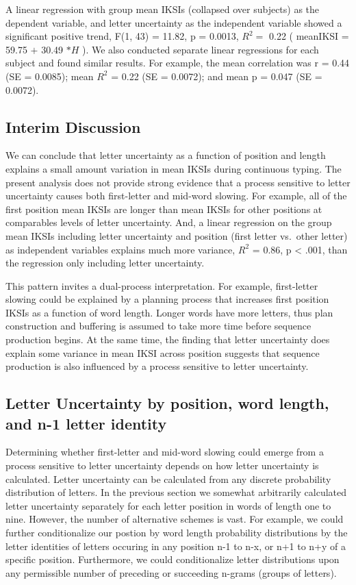 \documentclass[floatsintext,man]{apa6}
\theoremstyle{definition}
\theoremstyle{definition}
\theoremstyle{definition}
\theoremstyle{remark}
\begin{document}
A linear regression with group mean IKSIs (collapsed over subjects) as
the dependent variable, and letter uncertainty as the independent
variable showed a significant positive trend, F(1, 43) = 11.82, p =
0.0013, \(R^2 =\) 0.22 ( meanIKSI = 59.75 \(+\) 30.49 \(* H\) ). We also
conducted separate linear regressions for each subject and found similar
results. For example, the mean correlation was r = 0.44 (SE = 0.0085);
mean \(R^2\) = 0.22 (SE = 0.0072); and mean p = 0.047 (SE = 0.0072).

\subsection{Interim Discussion}\label{interim-discussion}

We can conclude that letter uncertainty as a function of position and
length explains a small amount variation in mean IKSIs during continuous
typing. The present analysis does not provide strong evidence that a
process sensitive to letter uncertainty causes both first-letter and
mid-word slowing. For example, all of the first position mean IKSIs are
longer than mean IKSIs for other positions at comparables levels of
letter uncertainty. And, a linear regression on the group mean IKSIs
including letter uncertainty and position (first letter vs.~other
letter) as independent variables explains much more variance, \(R^2\) =
0.86, p \textless{} .001, than the regression only including letter
uncertainty.

This pattern invites a dual-process interpretation. For example,
first-letter slowing could be explained by a planning process that
increases first position IKSIs as a function of word length. Longer
words have more letters, thus plan construction and buffering is assumed
to take more time before sequence production begins. At the same time,
the finding that letter uncertainty does explain some variance in mean
IKSI across position suggests that sequence production is also
influenced by a process sensitive to letter uncertainty.

\subsection{Letter Uncertainty by position, word length, and n-1 letter
identity}\label{letter-uncertainty-by-position-word-length-and-n-1-letter-identity}

Determining whether first-letter and mid-word slowing could emerge from
a process sensitive to letter uncertainty depends on how letter
uncertainty is calculated. Letter uncertainty can be calculated from any
discrete probability distribution of letters. In the previous section we
somewhat arbitrarily calculated letter uncertainty separately for each
letter position in words of length one to nine. However, the number of
alternative schemes is vast. For example, we could further
conditionalize our postion by word length probability distributions by
the letter identities of letters occuring in any position n-1 to n-x, or
n+1 to n+y of a specific position. Furthermore, we could conditionalize
letter distributions upon any permissible number of preceding or
succeeding n-grams (groups of letters).
\end{document}
